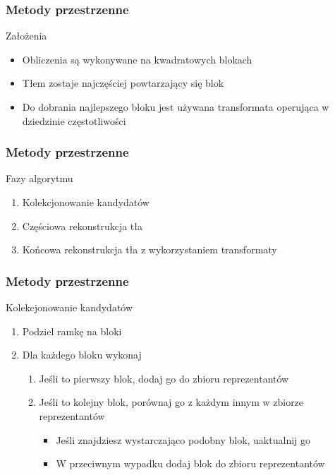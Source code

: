 \documentclass{beamer}
\begin{document}
\begin{frame}
\frametitle{Metody przestrzenne}
\begin{block}{Założenia}
\begin{itemize}
\item Obliczenia są wykonywane na kwadratowych blokach
\item Tłem zostaje najczęściej powtarzający się blok
\item Do dobrania najlepszego bloku jest używana transformata operująca w dziedzinie częstotliwości
\end{itemize}
\end{block}


\end{frame}
\begin{frame}
\frametitle{Metody przestrzenne}
\begin{block}{Fazy algorytmu}

\begin{enumerate}
\item Kolekcjonowanie kandydatów
\item Częściowa rekonstrukcja tła
\item Końcowa rekonstrukcja tła z wykorzystaniem transformaty
\end{enumerate}
\end{block}


\end{frame}
\begin{frame}
\frametitle{Metody przestrzenne}
\begin{block}{Kolekcjonowanie kandydatów}

\begin{enumerate}
\item Podziel ramkę na bloki
\item Dla każdego bloku wykonaj
	\begin{enumerate}
	\item Jeśli to pierwszy blok, dodaj go do zbioru reprezentantów
	\item Jeśli to kolejny blok, porównaj go z każdym innym w zbiorze reprezentantów
		\begin{itemize}
		\item Jeśli znajdziesz wystarczająco podobny blok, uaktualnij go
		\item W przeciwnym wypadku dodaj blok do zbioru reprezentantów
		\end{itemize}
	\end{enumerate}
\end{enumerate}
\end{block}


\end{frame}
\end{document}
